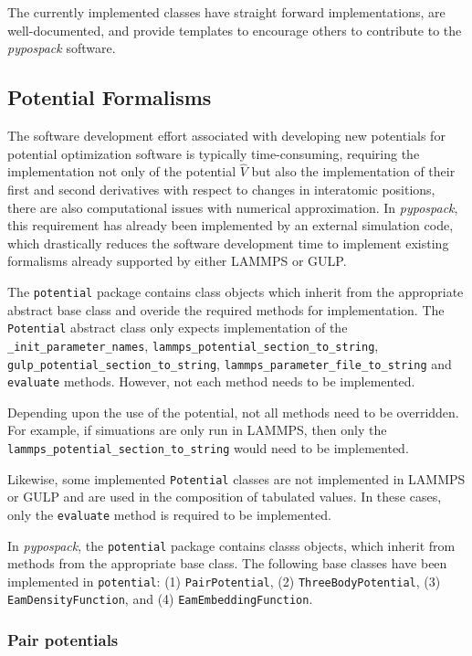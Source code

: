 The currently implemented classes have straight forward implementations, are well-documented, and provide templates to encourage others to contribute to the \emph{pypospack} software.

\subsection{Potential Formalisms}

The software development effort associated with developing new potentials for potential optimization software is typically time-consuming, requiring the implementation not only of the potential $\hat{V}$ but also the implementation of their first and second derivatives with respect to changes in interatomic positions, there are also computational issues with numerical approximation.  In \emph{pypospack}, this requirement has already been implemented by an external simulation code, which drastically reduces the software development time to implement existing formalisms already supported by either LAMMPS or GULP.

The \verb|potential| package contains class objects which inherit from the appropriate abstract base class and overide the required methods for implementation.  The \verb|Potential| abstract class only expects implementation of the \verb|_init_parameter_names|, \verb|lammps_potential_section_to_string|, \verb|gulp_potential_section_to_string|, \verb|lammps_parameter_file_to_string| and \verb|evaluate| methods.  However, not each method needs to be implemented.

Depending upon the use of the potential, not all methods need to be overridden.  For example, if simuations are only run in LAMMPS, then only the \verb|lammps_potential_section_to_string| would need to be implemented.

Likewise, some implemented \verb|Potential| classes are not implemented in LAMMPS or GULP and are used in the composition of tabulated values.  In these cases, only the \verb|evaluate| method is required to be implemented.

In \emph{pypospack}, the \verb|potential| package contains classs objects, which inherit from methods from the appropriate base class.  The following base classes have been implemented in \verb|potential|: (1) \verb|PairPotential|, (2) \verb|ThreeBodyPotential|, (3) \verb|EamDensityFunction|, and (4) \verb|EamEmbeddingFunction|.

\subsubsection{Pair potentials}

